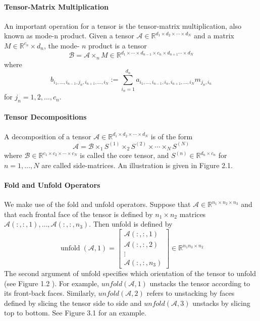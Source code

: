 \documentclass[english]{article}
\newcommand{\<}{\langle}
\renewcommand{\>}{\rangle}
\theoremstyle{definition}
\begin{document}
\paragraph{Tensor-Matrix Multiplication} An important operation for a tensor is the tensor-matrix multiplication, also known as mode-n product. Given a tensor $ \mathcal{A} \in \mathbb{R}^{d_{1} \times d_{2} \times \cdots \times d_{N}} $ and a matrix $ M \in   \mathbb{R}^{c_{n}} \times d_{n}$,  the mode-  $n $ product is a tensor
$$ \mathcal{B}=\mathcal{A} \times_{n} M \in \mathbb{R}^{d_{1} \times \cdots \times d_{n-1} \times c_{n} \times d_{n+1} \cdots \times d_{N}} $$
where $$
b_{i_{1}, \ldots, i_{n-1}, j_{n}, i_{n+1}, \ldots, i_{N}}:=\sum_{i_{n}=1}^{d_{n}} a_{i_{1}, \ldots, i_{n-1}, i_{n}, i_{n+1}, \ldots, i_{N}} m_{j_{n}, i_{n}} $$
for $ j_{n}=1,2, \ldots, c_{n} $.
\paragraph{Tensor Decompositions} A decomposition of a tensor $ \mathcal{A} \in \mathbb{R}^{d_{1} \times d_{2} \times \cdots \times d_{N}} $ is of the form
$$
\mathcal{A}=\mathcal{B} \times_{1} S^{(1)} \times_{2} S^{(2)} \times \cdots \times_{N} S^{(N)} $$
where $ \mathcal{B} \in \mathbb{R}^{c_{1} \times c_{2} \times \cdots \times c_{N}} $ is called the core tensor, and $ S^{(n)} \in \mathbb{R}^{d_{n} \times c_{n}} $ for $ n=1, \ldots, N $ are called side-matrices. An illustration is given in Figure 2.1.
\paragraph{Fold and Unfold Operators} We make use of the fold and unfold operators. Suppose that  $\mathcal{A} \in \mathbb{R}^{n_{1} \times n_{2} \times n_{3}}$ and that each frontal face of the tensor is defined by  $n_{1} \times n_{2}$  matrices  $\mathcal{A}(:,:, 1), \ldots,   \mathcal{A}\left(:,:, n_{3}\right)$.  Then unfold is defined by
\begin{equation*}
\operatorname{unfold}(\mathcal{A}, 1)=\left[\begin{array}{c}
\mathcal{A}(:,:, 1) \\
\mathcal{A}(:,:, 2) \\
\vdots \\
\mathcal{A}\left(:,:, n_{3}\right)
\end{array}\right] \in \mathbb{R}^{n_{1} n_{3} \times n_{2}}
\end{equation*}
The second argument of unfold specifies which orientation of the tensor to unfold (see Figure 1.2 ). For example, $unfold  (\mathcal{A}, 1)$  unstacks the tensor according to its front-back faces. Similarly, $unfold(  \mathcal{A}, 2  )$ refers to unstacking by faces defined by slicing the tensor side to side and $unfold  (\mathcal{A}, 3)$  unstacks by slicing top to bottom. See Figure 3.1 for an example.
\end{document}
